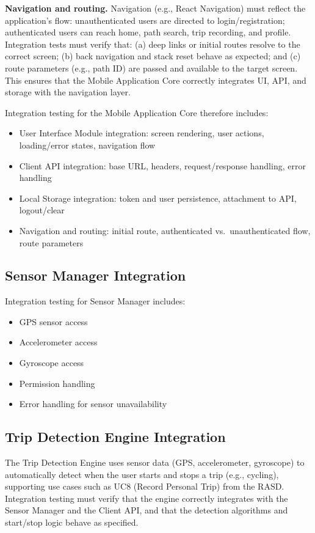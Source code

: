 \textbf{Navigation and routing.}
Navigation (e.g., React Navigation) must reflect the application's flow: unauthenticated users are directed to login/registration; authenticated users can reach home, path search, trip recording, and profile. Integration tests must verify that: (a) deep links or initial routes resolve to the correct screen; (b) back navigation and stack reset behave as expected; and (c) route parameters (e.g., path ID) are passed and available to the target screen. This ensures that the Mobile Application Core correctly integrates UI, API, and storage with the navigation layer.

Integration testing for the Mobile Application Core therefore includes:
\begin{itemize}
    \item User Interface Module integration: screen rendering, user actions, loading/error states, navigation flow
    \item Client API integration: base URL, headers, request/response handling, error handling
    \item Local Storage integration: token and user persistence, attachment to API, logout/clear
    \item Navigation and routing: initial route, authenticated vs.\ unauthenticated flow, route parameters
\end{itemize}

\subsection{Sensor Manager Integration}
\label{subsec:sensor_manager_integration}%

Integration testing for Sensor Manager includes:
\begin{itemize}
    \item GPS sensor access
    \item Accelerometer access
    \item Gyroscope access
    \item Permission handling
    \item Error handling for sensor unavailability
\end{itemize}

\subsection{Trip Detection Engine Integration}
\label{subsec:trip_detection_engine_integration}%

The Trip Detection Engine uses sensor data (GPS, accelerometer, gyroscope) to automatically detect when the user starts and stops a trip (e.g., cycling), supporting use cases such as UC8 (Record Personal Trip) from the RASD. Integration testing must verify that the engine correctly integrates with the Sensor Manager and the Client API, and that the detection algorithms and start/stop logic behave as specified.

